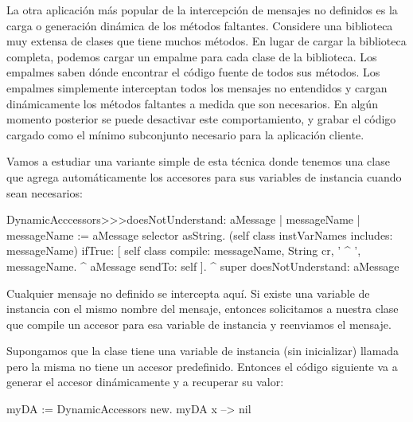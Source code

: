 \documentclass[a4paper,10pt,twoside]{book}
\begin{document}
La otra aplicaci\'on m\'as popular de la intercepci\'on de mensajes no
definidos es la carga o generaci\'on din\'amica de los m\'etodos faltantes.
Considere una biblioteca muy extensa de clases que tiene muchos
m\'etodos.  En lugar de cargar la biblioteca completa, podemos cargar un
empalme para cada clase de la biblioteca.  Los empalmes saben
d\'onde encontrar el c\'odigo fuente de todos sus m\'etodos.  Los
empalmes simplemente interceptan todos los mensajes no entendidos y cargan din\'amicamente los m\'etodos faltantes a medida que son necesarios.  En alg\'un momento posterior se puede desactivar este comportamiento, y grabar el c\'odigo cargado como el m\'inimo subconjunto necesario para la aplicaci\'on cliente.


Vamos a estudiar una variante simple de esta t\'ecnica donde tenemos una
clase que agrega autom\'aticamente los accesores para sus variables de
instancia cuando sean necesarios:

\begin{code}{}
DynamicAcccessors>>>doesNotUnderstand: aMessage
        | messageName |
        messageName := aMessage selector asString.
        (self class instVarNames includes: messageName)
                ifTrue: [
                        self class compile: messageName, String cr, ' ^ ', messageName.
                        ^ aMessage sendTo: self ].
        ^ super doesNotUnderstand: aMessage
\end{code}
Cualquier mensaje no definido se intercepta aqu\'i.  Si existe una
variable de instancia con el mismo nombre del mensaje, entonces
solicitamos a nuestra clase que compile un accesor para esa variable
de instancia y reenviamos el mensaje.

Supongamos que la clase  tiene una variable de
instancia (sin inicializar) llamada  pero la misma no tiene un
accesor predefinido.  Entonces el c\'odigo siguiente va a generar el
accesor din\'amicamente y a recuperar su valor:
\begin{code}{}
myDA := DynamicAccessors new.
myDA x --> nil
\end{code}
\end{document}

